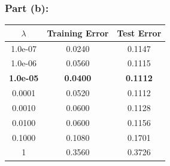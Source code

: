 \documentclass[11pt]{article}
\begin{document}
\begin{flushleft}
\subsubsection*{Part (b):}

\begin{figure}[H]
	\centering
\end{figure}

\begin{center}
	\begin{tabular}{||c c c||} 
		\hline
		$\lambda$ & Training Error & Test Error \\ [0.5ex] 
		\hline\hline
		1.0e-07 & 0.0240 & 0.1147 \\
		\hline
		1.0e-06 & 0.0560 & 0.1115 \\
		\hline
		\textbf{1.0e-05} & \textbf{0.0400} & \textbf{0.1112} \\
		\hline
		0.0001 & 0.0520 & 0.1112 \\
		\hline
		0.0010 & 0.0600 & 0.1128 \\
		\hline
		0.0100 & 0.0600 & 0.1156 \\
		\hline
		0.1000 & 0.1080 & 0.1701 \\
		\hline
		1 & 0.3560 & 0.3726 \\
		\hline
	\end{tabular}
\end{center}


\end{flushleft}
\end{document}
